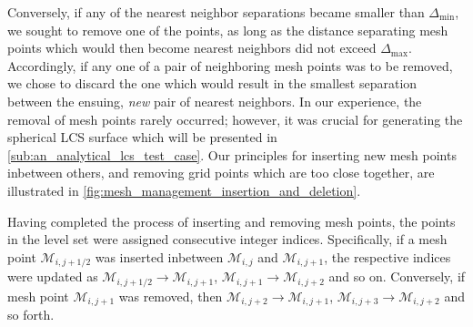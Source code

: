 Conversely, if any of the nearest neighbor separations became smaller than
$\Delta_{\min}$, we sought to remove one of the points, as long as the
distance separating mesh points which would then become nearest neighbors
did not exceed $\Delta_{\max}$. Accordingly, if any one of a pair of
neighboring mesh points was to be removed, we chose to discard the one which
would result in the smallest separation between the ensuing, \emph{new} pair of
nearest neighbors. In our experience, the removal of mesh points rarely
occurred; however, it was crucial for generating the spherical LCS surface
which will be presented in \cref{sub:an_analytical_lcs_test_case}.
Our principles for inserting new mesh points inbetween
others, and removing grid points which are too close together, are illustrated
in \cref{fig:mesh_management_insertion_and_deletion}.



Having completed the process of inserting and removing mesh points, the
points in the level set were assigned consecutive integer indices.
Specifically, if a mesh point $\mathcal{M}_{i,j+1/2}$ was inserted
inbetween $\mathcal{M}_{i,j}$ and $\mathcal{M}_{i,j+1}$, the respective indices
were updated as $\mathcal{M}_{i,j+1/2}\to\mathcal{M}_{i,j+1}$,
$\mathcal{M}_{i,j+1}\to\mathcal{M}_{i,j+2}$ and so on. Conversely, if mesh
point $\mathcal{M}_{i,j+1}$ was removed, then
$\mathcal{M}_{i,j+2}\to\mathcal{M}_{i,j+1}$,
$\mathcal{M}_{i,j+3}\to\mathcal{M}_{i,j+2}$ and so forth.
